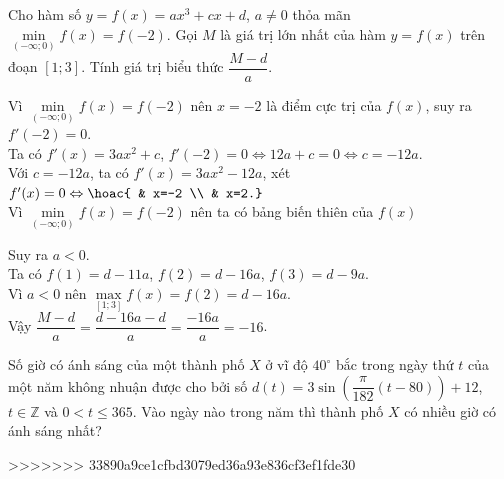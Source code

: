 \begin{ex}%
    Cho hàm số $y=f(x)=ax^3+cx+d$, $a\neq0$ thỏa mãn $\min\limits_{(-\infty;0)} f(x)=f(-2)$. Gọi $M$ là giá trị lớn nhất của hàm $y=f(x)$ trên đoạn $[1;3]$. Tính giá trị biểu thức $\dfrac{M-d}{a}$.
    \loigiai
    {
        Vì $\min\limits_{(-\infty;0)} f(x)=f(-2)$ nên $x=-2$ là điểm cực trị của $f(x)$, suy ra $f'(-2)=0$. \\
        Ta có $f'(x)=3ax^2+c$, $f'(-2)=0 \Leftrightarrow 12a+c=0 \Leftrightarrow c=-12a$. \\
        Với $c=-12a$, ta có $f'(x)=3ax^2-12a$, xét $f'(x)=0 \Leftrightarrow \hoac{ & x=-2 \\ & x=2.}$ \\
        Vì $\min\limits_{(-\infty;0)} f(x)=f(-2)$ nên ta có bảng biến thiên của $f(x)$
        \begin{center}
        \end{center}
        Suy ra $a<0$. \\
        Ta có $f(1)=d-11a$, $f(2)=d-16a$, $f(3)=d-9a$. \\
        Vì $a<0$ nên $\max\limits_{[1;3]} f(x)=f(2)=d-16a$. \\
        Vậy $\dfrac{M-d}{a}=\dfrac{d-16a-d}{a}=\dfrac{-16a}{a}=-16$.
    }
\end{ex}
\begin{ex}%
    Số giờ có ánh sáng của một thành phố $X$ ở vĩ độ $40^\circ$ bắc trong ngày thứ $t$ của một năm không nhuận được cho bởi số $d(t)=3\sin\left(\dfrac{\pi}{182}(t-80)\right)+12$, $t\in\mathbb{Z}$ và $0<t\leq 365$. Vào ngày nào trong năm thì thành phố $X$ có nhiều giờ có ánh sáng nhất?
\end{ex}
>>>>>>> 33890a9ce1cfbd3079ed36a93e836cf3ef1fde30
